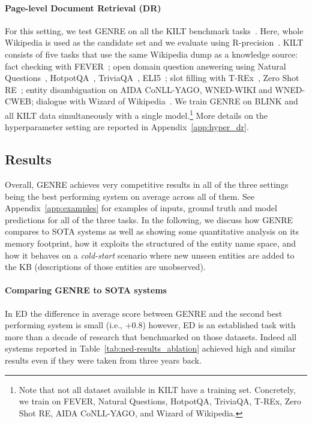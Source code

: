 \documentclass{article} \usepackage{main,times}
\makeatletter
\def\genre{\textsc{GENRE}\@\xspace}
\makeatother
\begin{document}
\paragraph{Page-level Document Retrieval (DR)}
For this setting, we test \genre on all the KILT benchmark tasks~\citep{petroni2020kilt}.
Here, whole Wikipedia is used as the candidate set and we evaluate using R-precision~\citep{rprecdefinition}.
KILT consists of five tasks that use the same Wikipedia dump as a knowledge source: fact checking with FEVER~\citep{thorne-etal-2018-fever}; open domain question answering using Natural Questions~\citep{kwiatkowski2019natural},
HotpotQA~\citep{yang-etal-2018-hotpotqa},
TriviaQA~\citep{joshi2017triviaqa},
ELI5~\citep{fan2019eli5}; slot filling with T-REx~\citep{elsahar2019t},
Zero Shot RE~\citep{levy2017zero}; entity disambiguation on AIDA CoNLL-YAGO, WNED-WIKI and WNED-CWEB; dialogue with Wizard of Wikipedia~\citep{dinan2018wizard}. We train \genre on BLINK and all KILT data simultaneously with a single model.\footnote{Note that not all dataset available in KILT have a training set. Concretely, we train on FEVER, Natural Questions, HotpotQA, TriviaQA, T-REx, Zero Shot RE, AIDA CoNLL-YAGO, and Wizard of Wikipedia.} More details on the hyperparameter setting are reported in Appendix~\ref{app:hyper_dr}. 



\subsection{Results} \label{sec:experiments_results}

Overall, \genre achieves very competitive results in all of the three settings being the best performing system on average across all of them.
See Appendix~\ref{app:examples} for examples of inputs, ground truth and model predictions for all of the three tasks. In the following, we discuss how \genre compares to SOTA systems as well as showing some quantitative analysis on its memory footprint, how it exploits the structured of the entity name space, and how it behaves on a \textit{cold-start} scenario where new unseen entities are added to the KB (descriptions of those entities are unobserved).

\paragraph{Comparing \genre to SOTA systems}
In ED the difference in average  score between \genre and the second best performing system is small (i.e., +0.8) however, ED is an established task with more than a decade of research that benchmarked on those datasets. Indeed all systems reported in Table~\ref{tab:ned-results_ablation} achieved high and similar results even if they were taken from three years back.
\end{document}
